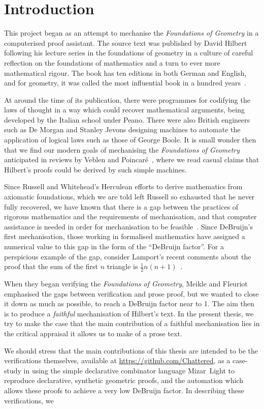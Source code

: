 \chapter{Introduction}\label{chapter:Introduction}
This project began as an attempt to mechanise the \emph{Foundations of Geometry} in a computerised proof assistant. The source text was published by David Hilbert following his lecture series in the foundations of geometry in a culture of careful reflection on the foundations of mathematics and a turn to ever more mathematical rigour. The book has ten editions in both German and English, and for geometry, it was called the most influential book in a hundred years~\cite{BirkhoffHilbertInfluence}. 

At around the time of its publication, there were programmes for codifying the laws of thought in a way which could recover mathematical arguments, being developed by the Italian school under Peano. There were also British engineers such as De Morgan and Stanley Jevons designing machines to automate the application of logical laws such as those of George Boole. It is small wonder then that we find our modern goals of mechanising the \emph{Foundations of Geometry} anticipated in reviews by Veblen and Poincar\'{e}~\cite{VeblenHilbertReview,PoincareReview}, where we read casual claims that Hilbert's proofs could be derived by such simple machines.

Since Russell and Whitehead's Herculean efforts to derive mathematics from axiomatic foundations, which we are told left Russell so exhausted that he never fully recovered, we have known that there is a gap between the practices of rigorous mathematics and the requirements of mechanisation, and that computer assistance is needed in order for mechanisation to be feasible~\cite{FormalizedMathematics}. Since DeBruijn's first mechanisation, those working in formalised mathematics have assigned a numerical value to this gap in the form of the ``DeBruijn factor''. For a perspicious example of the gap, consider Lamport's recent comments about the proof that the sum of the first $n$ triangle is $\tfrac{1}{2}n(n+1)$~\cite{ProofMessageCertificate}.

When they began verifying the \emph{Foundations of Geometry}, Meikle and Fleuriot~\cite{MeikleFleuriotFormalizingHilbert} emphasised the gaps between verification and prose proof, but we wanted to close it down as much as possible, to reach a DeBruijn factor near to 1. The aim then is to produce a \emph{faithful} mechanisation of Hilbert's text. In the present thesis, we try to make the case that the main contribution of a faithful mechanisation lies in the critical appraisal it allows us to make of a prose text.

We should stress that the main contributions of this thesis are intended to be the verifications themselves, available at \url{https://github.com/Chattered}, as a case-study in using the simple declarative combinator language Mizar~Light to reproduce declarative, synthetic geometric proofs, and the automation which allows these proofs to achieve a very low DeBruijn factor. In describing these verifications, we 

